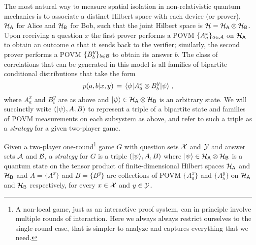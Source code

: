 The most natural way to measure spatial isolation in non-relativistic quantum mechanics is to associate a distinct Hilbert space with each device (or prover), $\mathcal{H}_{\textsf{A}}$ for Alice and $\mathcal{H}_{{\textsf{B}}}$ for Bob, such that the joint Hilbert space is $\mathcal{H} = \mathcal{H}_{\textsf{A}} \otimes \mathcal{H}_{\textsf{B}}$. Upon receiving a question $x$ the first prover performs a POVM $\{A^x_a\}_{a\in\mathcal{A}}$ on $\mathcal{H}_{\textsf{A}}$ to obtain an outcome $a$ that it sends back to the verifier; similarly, the second prover performs a POVM $\{B^y_b\}_{b\in\mathcal{B}}$ to obtain its answer $b$. The class of correlations that can be generated in this model is all families of bipartite conditional distributions that take the form
\begin{equation}\label{eq:tensor-model} 
p(a,b|x,y)\,=\, \langle\psi| A^x_a \otimes B^y_b |\psi\rangle\;,
\end{equation}
where $A^x_a$ and $B^y_b$ are as above and $|\psi\rangle \in \mathcal{H}_{\textsf{A}} \otimes \mathcal{H}_{\textsf{B}}$ is an arbitrary state. We will succinctly write $(|\psi\rangle,A,B)$ to represent a triple of a bipartite state and families of POVM measurements on each subsystem as above, and refer to such a triple as a \emph{strategy} for a given two-player game. 

\begin{definition}
Given a two-player one-round\footnote{A non-local game, just as an interactive proof system, can in principle involve multiple rounds of interaction. Here we always always restrict ourselves to the single-round case, that is simpler to analyze and captures everything that we need.} game $G$ with question sets $\mathcal{X}$ and $\mathcal{Y}$ and answer sets $\mathcal{A}$ and $\mathcal{B}$, a \emph{strategy} for $G$ is a triple $(|\psi\rangle,A,B)$ where $|\psi\rangle \in \mathcal{H}_{\textsf{A}} \otimes \mathcal{H}_{\textsf{B}}$ is a quantum state on the tensor product of finite-dimensional Hilbert spaces $\mathcal{H}_{\textsf{A}}$ and $\mathcal{H}_{{\textsf{B}}}$ and $A = \{A^x\}$ and $B=\{B^y\}$ are collections of POVM $\{A^x_a\}$ and $\{A^y_b\}$ on $\mathcal{H}_{\textsf{A}}$ and $\mathcal{H}_{\textsf{B}}$ respectively, for every $x\in \mathcal{X}$ and $y\in \mathcal{Y}$. 
\end{definition}

